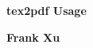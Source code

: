 \begin{titlepage}
  \begin{center}
  \thispagestyle{empty}

  \vspace*{0.5cm}

  \Huge
  \textbf{tex2pdf Usage}

  \vspace{0.5cm}
  \vfill

  \Large
  \textbf{Frank Xu}

  \end{center}
  \clearpage

\end{titlepage}
